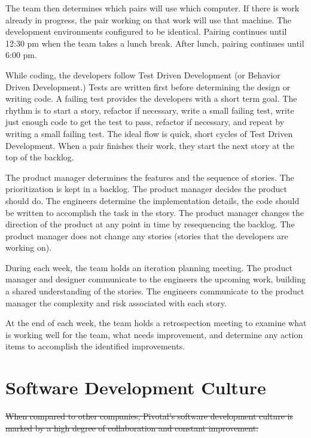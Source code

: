 The team then determines which pairs will use which computer. If there is work already in progress, the pair working on that work will use that machine. The development environments configured to be identical. Pairing continues until 12:30 pm when the team takes a lunch break. After lunch, pairing continues until 6:00 pm. 


While coding, the developers follow Test Driven Development (or Behavior Driven Development.) Tests are written first before determining the design or writing code. A failing test provides the developers with a short term goal. The rhythm is to start a story, refactor if necessary, write a small failing test, write just enough code to get the test to pass, refactor if necessary, and repeat by writing a small failing test. The ideal flow is quick, short cycles of Test Driven Development. When a pair finishes their work, they start the next story at the top of the backlog. 


The product manager determines the features and the sequence of stories. The prioritization is kept in a backlog. The product manager decides  the product should do. The engineers determine the implementation details,  the code should be written to accomplish the task in the story. The product manager changes the direction of the product at any point in time by resequencing the backlog. The product manager does not change any  stories (stories that the developers are working on).


During each week, the team holds an iteration planning meeting. The product manager and designer communicate to the engineers the upcoming work, building a shared understanding of the stories. The engineers communicate to the product manager the complexity and risk associated with each story.


At the end of each week, the team holds a retrospection meeting to examine what is working well for the team, what needs improvement, and determine any action items to accomplish the identified improvements.






\section{Software Development Culture}
\sout{When compared to other companies, Pivotal's software development culture is marked by a high degree of collaboration and constant improvement.}


